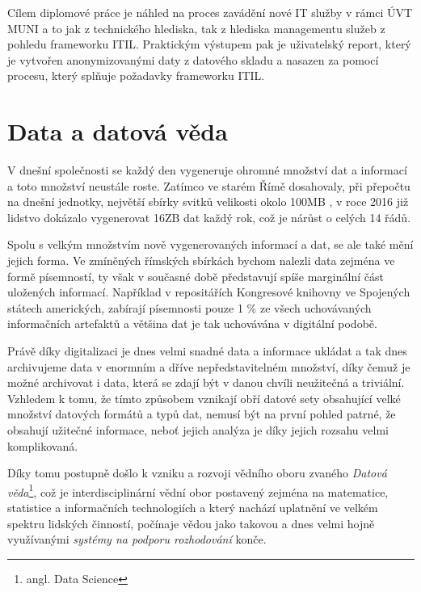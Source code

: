 \documentclass[
  digital,     %
  twoside,     %
  lof,         %
  lot,         %
]{fithesis4}
\begin{document}
Cílem diplomové práce je náhled na proces zavádění nové IT služby v rámci ÚVT MUNI a to jak z technického hlediska, tak z hlediska managementu služeb z pohledu frameworku ITIL. Praktickým výstupem pak je uživatelský report, který je vytvořen anonymizovanými daty z datového skladu a nasazen za pomocí procesu, který splňuje požadavky frameworku ITIL.

\section{Data a datová věda}
V dnešní společnosti se každý den vygeneruje ohromné množství dat a informací a toto množství neustále roste. Zatímco ve starém Římě dosahovaly, při přepočtu na dnešní jednotky, největší sbírky svitků velikosti okolo 100MB \parencite[p.~157]{Smil2021}, v roce 2016 již lidstvo dokázalo vygenerovat 16ZB dat každý rok\parencite[p.~160]{Smil2021}, což je nárůst o celých 14 řádů.

Spolu s velkým množstvím nově vygenerovaných informací a dat, se ale také mění jejich forma. Ve zmíněných římských sbírkách bychom nalezli data zejména ve formě písemností, ty však v současné době představují spíše marginální část uložených informací. Například v repositářích Kongresové knihovny ve Spojených státech amerických, zabírají písemnosti pouze 1 \% ze všech uchovávaných informačních artefaktů \parencite[p.~158]{Smil2021} a většina dat je tak uchovávána v digitální podobě.

Právě díky digitalizaci je dnes velmi snadné data a informace ukládat a tak dnes archivujeme data v enormním a dříve nepředstavitelném množství, díky čemuž je možné archivovat i data, která se zdají být v danou chvíli neužitečná a triviální. Vzhledem k tomu, že tímto způsobem vznikají obří datové sety obsahující velké množství datových formátů a typů dat, nemusí být na první pohled patrné, že obsahují užitečné informace, neboť jejich analýza je díky jejich rozsahu velmi komplikovaná.

Díky tomu postupně došlo k vzniku a rozvoji vědního oboru zvaného \emph{Datová věda}\footnote{angl. Data Science}, což je interdisciplinární vědní obor postavený zejména na matematice, statistice a informačních technologiích a který nachází uplatnění ve velkém spektru lidských činností, počínaje vědou jako takovou a dnes velmi hojně využívanými \emph{systémy na podporu rozhodování} konče.
\end{document}
